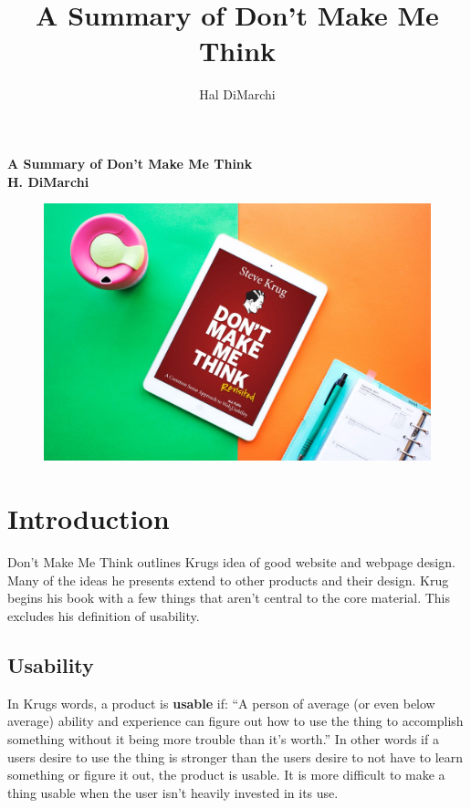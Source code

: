 \documentclass{article}%
\title{A Summary of Don't Make Me Think}%
\author{Hal DiMarchi}%
\begin{document}
%
\normalsize%
\begin{titlepage}
  \centering
  \vfill
  {\bfseries\Large
      A Summary of Don't Make Me Think\\
      H. DiMarchi\\
  }
  \vfill
  \begin{figure}[h]
    \includegraphics[width=1.32\textwidth, center]{nothinkyitsstinky}
  \end{figure}
  \vfill
\end{titlepage}
%
\newpage%
\tableofcontents%
\newpage%
\section{Introduction}%
\label{sec:Introduction}%
  Don't Make Me Think outlines Krugs idea of good website and webpage design. Many of
  the ideas he presents extend to other products and their design.
  Krug begins his book with a few things that aren't central to the core material.
  This excludes his definition of usability.
  \subsection{Usability}
    In Krugs words, a product is \textbf{usable} if: \newline
    ``A person of average (or even below average) ability and experience can figure out how to
    use the thing to accomplish something without it being more trouble than it’s worth.''
    \newline
    In other words if a users desire to use the thing is stronger than the users desire
    to not have to learn something or figure it out, the product is usable. It is more
    difficult to make a thing usable when the user isn't heavily invested in its use.
\end{document}

